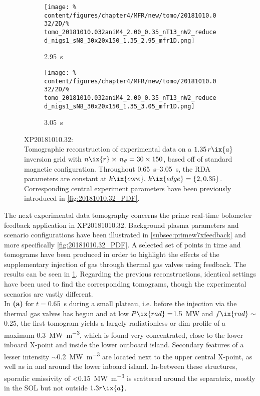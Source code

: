 \begin{figure}[t]
\begin{subfigure}{0.45\textwidth}
                    \caption{\SI{2.95}{\second}}%
                    \texttt{[image: \%
                        content/figures/chapter4/MFR/new/tomo/20181010.032/2D/\%
                        tomo\_20181010.032aniM4\_2.00\_0.35\_nT13\_nW2\_reduced\_nigs1\_sN8\_30x20x150\_1.35\_2.95\_mfr1D.png]}%
                    \end{subfigure}%
                \hfill%
                \begin{subfigure}{0.45\textwidth}%
                    \centering%
                    \caption{\SI{3.05}{\second}}%
                    \texttt{[image: \%
                        content/figures/chapter4/MFR/new/tomo/20181010.032/2D/\%
                        tomo\_20181010.032aniM4\_2.00\_0.35\_nT13\_nW2\_reduced\_nigs1\_sN8\_30x20x150\_1.35\_3.05\_mfr1D.png]}%
                \end{subfigure}%
                \caption{%
                    XP20181010.32:\\%
                    Tomographic reconstruction of experimental data on a $1.35\,r\ix{a}$ inversion grid with $n\ix{r}\times\,n_{\vartheta}=30\times150$, based off of standard magnetic configuration. Throughout \SIrange{0.65}{3.05}{\second}, the RDA parameters are constant at $k\ix{core},\,k\ix{edge}=\left\{2, 0.35\right\}$. Corresponding central experiment parameters have been previously introduced in \cref{fig:20181010.32_PDF}.}\label{fig:tomo_20181010.32_times}%
            \end{figure}%
%
            The next experimental data tomography concerns the prime real-time bolometer feedback application in XP20181010.32. Background plasma parameters and scenario configurations have been illustrated in \cref{subsec:primew7xfeedback} and more specifically \cref{fig:20181010.32_PDF}. A selected set of points in time and tomograms have been produced in order to highlight the effects of the supplementary injection of gas through thermal gas valves using feedback. The results can be seen in \cref{fig:tomo_20181010.32_times}. Regarding the previous reconstructions, identical settings have been used to find the corresponding tomograms, though the experimental scenarios are vastly different.\\%
            In \textbf{(a)} for $t=$\SI{0.65}{\second} during a small plateau, i.e. before the injection via the thermal gas valves has begun and at low $P\ix{rad}=$\SI{1.5}{\mega\watt} and $f\ix{rad}\sim$\SI{0.25}{\arbitraryunit}, the first tomogram yields a largely radiationless or dim profile of a maximum \SI{0.3}{\mega\watt\per\cubic\meter}, which is found very concentrated, close to the lower inboard X-point and inside the lower outboard island. Secondary features of a lesser intensity $\sim$\SI{0.2}{\mega\watt\per\cubic\meter} are located next to the upper central X-point, as well as in and around the lower inboard island. In-between these structures, sporadic emissivity of <\SI{0.15}{\mega\watt\per\cubic\meter} is scattered around the separatrix, mostly in the SOL but not outside $1.3r\ix{a}$.\\%
